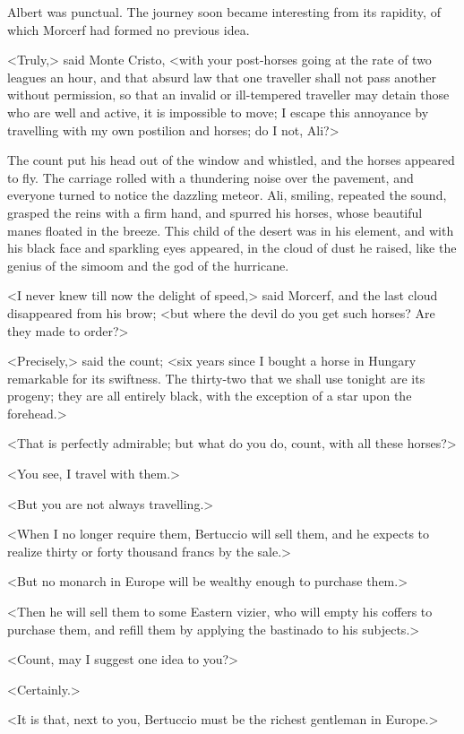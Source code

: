  Albert was punctual. The journey soon became interesting from its rapidity, of which Morcerf had formed no previous idea. 

 <Truly,> said Monte Cristo, <with your post-horses going at the rate of two leagues an hour, and that absurd law that one traveller shall not pass another without permission, so that an invalid or ill-tempered traveller may detain those who are well and active, it is impossible to move; I escape this annoyance by travelling with my own postilion and horses; do I not, Ali?> 

 The count put his head out of the window and whistled, and the horses appeared to fly. The carriage rolled with a thundering noise over the pavement, and everyone turned to notice the dazzling meteor. Ali, smiling, repeated the sound, grasped the reins with a firm hand, and spurred his horses, whose beautiful manes floated in the breeze. This child of the desert was in his element, and with his black face and sparkling eyes appeared, in the cloud of dust he raised, like the genius of the simoom and the god of the hurricane. 

 <I never knew till now the delight of speed,> said Morcerf, and the last cloud disappeared from his brow; <but where the devil do you get such horses? Are they made to order?> 

 <Precisely,> said the count; <six years since I bought a horse in Hungary remarkable for its swiftness. The thirty-two that we shall use tonight are its progeny; they are all entirely black, with the exception of a star upon the forehead.> 

 <That is perfectly admirable; but what do you do, count, with all these horses?> 

 <You see, I travel with them.> 

 <But you are not always travelling.> 

 <When I no longer require them, Bertuccio will sell them, and he expects to realize thirty or forty thousand francs by the sale.> 

 <But no monarch in Europe will be wealthy enough to purchase them.> 

 <Then he will sell them to some Eastern vizier, who will empty his coffers to purchase them, and refill them by applying the bastinado to his subjects.> 

 <Count, may I suggest one idea to you?> 

 <Certainly.> 

 <It is that, next to you, Bertuccio must be the richest gentleman in Europe.> 

